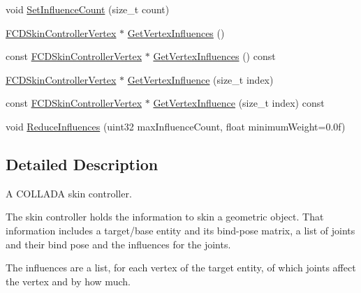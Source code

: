 \begin{DoxyCompactItemize}
\item 
void \hyperlink{classFCDSkinController_a9314bc3b96f9e9c25efd57f370c4f790}{SetInfluenceCount} (size\_\-t count)
\item 
\hyperlink{classFCDSkinControllerVertex}{FCDSkinControllerVertex} $\ast$ \hyperlink{classFCDSkinController_a75ee2c90f2f8011f476e4f96b1397641}{GetVertexInfluences} ()
\item 
const \hyperlink{classFCDSkinControllerVertex}{FCDSkinControllerVertex} $\ast$ \hyperlink{classFCDSkinController_a1bf89c968b4e0ffff2ac2478ea31ff2c}{GetVertexInfluences} () const 
\item 
\hyperlink{classFCDSkinControllerVertex}{FCDSkinControllerVertex} $\ast$ \hyperlink{classFCDSkinController_a1b403e5065c0a7635a424379208a1206}{GetVertexInfluence} (size\_\-t index)
\item 
const \hyperlink{classFCDSkinControllerVertex}{FCDSkinControllerVertex} $\ast$ \hyperlink{classFCDSkinController_ad1620f13499b450a80402e88a44089b3}{GetVertexInfluence} (size\_\-t index) const 
\item 
void \hyperlink{classFCDSkinController_aa6257743677e7d538e4b9fcbca98254c}{ReduceInfluences} (uint32 maxInfluenceCount, float minimumWeight=0.0f)
\end{DoxyCompactItemize}


\subsection{Detailed Description}
A COLLADA skin controller.

The skin controller holds the information to skin a geometric object. That information includes a target/base entity and its bind-\/pose matrix, a list of joints and their bind pose and the influences for the joints.

The influences are a list, for each vertex of the target entity, of which joints affect the vertex and by how much. 

